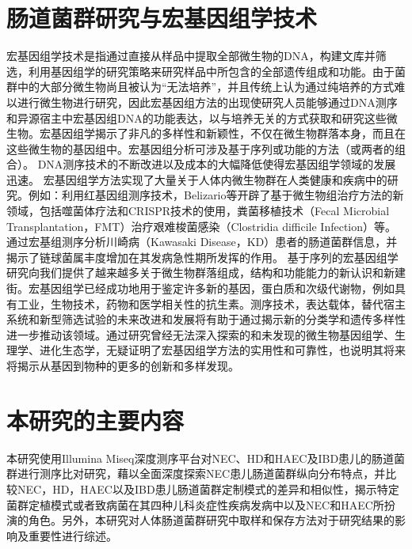 \section{肠道菌群研究与宏基因组学技术}
宏基因组学技术是指通过直接从样品中提取全部微生物的DNA，构建文库并筛选，利用基因组学的研究策略来研究样品中所包含的全部遗传组成和功能。由于菌群中的大部分微生物尚且被认为“无法培养”，并且传统上认为通过纯培养的方式难以进行微生物进行研究，因此宏基因组方法的出现使研究人员能够通过DNA测序和异源宿主中宏基因组DNA的功能表达，以与培养无关的方式获取和研究这些微生物。宏基因组学揭示了非凡的多样性和新颖性，不仅在微生物群落本身，而且在这些微生物的基因组中。宏基因组分析可涉及基于序列或功能的方法（或两者的组合）。 DNA测序技术的不断改进以及成本的大幅降低使得宏基因组学领域的发展迅速。
宏基因组学方法实现了大量关于人体内微生物群在人类健康和疾病中的研究。例如：利用红基因组测序技术，Belizario等开辟了基于微生物组治疗方法的新领域，包括噬菌体疗法和CRISPR技术的使用，粪菌移植技术（Fecal Microbial Transplantation，FMT）治疗艰难梭菌感染（Clostridia difficile Infection）等\cite{belizario2015human}。通过宏基组测序分析川崎病（Kawasaki Disease，KD）患者的肠道菌群信息，并揭示了链球菌属丰度增加在其发病急性期所发挥的作用\cite{kinumaki2015characterization}。
基于序列的宏基因组学研究向我们提供了越来越多关于微生物群落组成，结构和功能能力的新认识和新建街。宏基因组学已经成功地用于鉴定许多新的基因，蛋白质和次级代谢物，例如具有工业，生物技术，药物和医学相关性的抗生素。测序技术，表达载体，替代宿主系统和新型筛选试验的未来改进和发展将有助于通过揭示新的分类学和遗传多样性进一步推动该领域。通过研究曾经无法深入探索的和未发现的微生物基因组学、生理学、进化生态学，无疑证明了宏基因组学方法的实用性和可靠性，也说明其将来将揭示从基因到物种的更多的创新和多样发现。\\
\section{本研究的主要内容}
本研究使用Illumina Miseq深度测序平台对NEC、HD和HAEC及IBD患儿的肠道菌群进行测序比对研究，藉以全面深度探索NEC患儿肠道菌群纵向分布特点，并比较NEC，HD，HAEC以及IBD患儿肠道菌群定制模式的差异和相似性，揭示特定菌群定植模式或者致病菌在其四种儿科炎症性疾病发病中以及NEC和HAEC所扮演的角色。另外，本研究对人体肠道菌群研究中取样和保存方法对于研究结果的影响及重要性进行综述。
